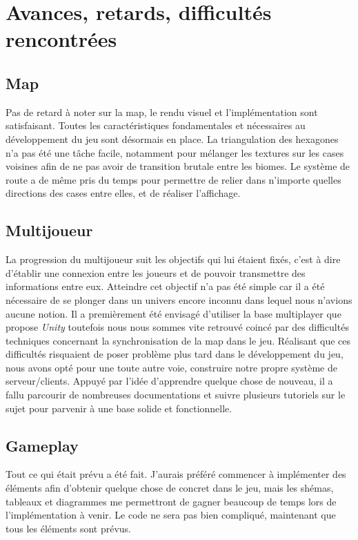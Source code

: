\documentclass[12pt]{report}
\begin{document}
\chapter{Avances, retards, difficultés rencontrées}

\section*{Map}

Pas de retard à noter sur la map, le rendu visuel et l’implémentation sont satisfaisant. Toutes les caractéristiques fondamentales et nécessaires au développement du jeu sont désormais en place. La triangulation des hexagones n’a pas été une tâche facile, notamment pour mélanger les textures sur les cases voisines afin de ne pas avoir de transition brutale entre les biomes. Le système de route a de même pris du temps pour permettre de relier dans n’importe quelles directions des cases entre elles, et de réaliser l’affichage.

\section*{Multijoueur}

La progression du multijoueur suit les objectifs qui lui étaient fixés, c’est à dire d’établir une connexion entre les joueurs et de pouvoir transmettre des informations entre eux. Atteindre cet objectif n’a pas été simple car il a été nécessaire de se plonger dans un univers encore inconnu dans lequel nous n’avions aucune notion. Il a premièrement été envisagé d’utiliser la base multiplayer que propose \textit{Unity} toutefois nous nous sommes vite retrouvé coincé par des difficultés techniques concernant la synchronisation de la map dans le jeu. Réalisant que ces difficultés risquaient de poser problème plus tard dans le développement du jeu, nous avons opté pour une toute autre voie, construire notre propre système de serveur/clients. Appuyé par l’idée d’apprendre quelque chose de nouveau, il a fallu parcourir de nombreuses documentations et suivre plusieurs tutoriels sur le sujet pour parvenir à une base solide et fonctionnelle.

\section*{Gameplay}

Tout ce qui était prévu a été fait. J'aurais préféré commencer à implémenter des éléments afin d'obtenir quelque chose de concret dans le jeu, mais les shémas, tableaux et diagrammes me permettront de gagner beaucoup de temps lors de l'implémentation à venir. Le code ne sera pas bien compliqué, maintenant que tous les éléments sont prévus.
\end{document}
